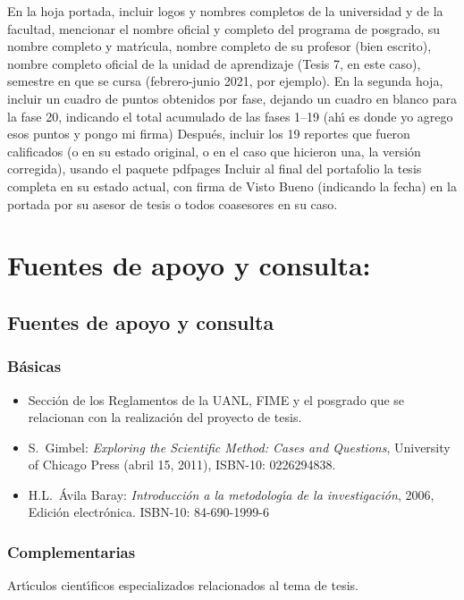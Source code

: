 \documentclass[10 pt]{article}
\begin{document}
En la hoja portada, incluir logos y nombres completos de la
universidad y de la facultad, mencionar el nombre oficial y completo
del programa de posgrado, su nombre completo y matr\'{\i}cula, nombre
completo de su profesor (bien escrito), nombre completo oficial de la
unidad de aprendizaje (Tesis 7, en este caso), semestre en que se
cursa (febrero-junio 2021, por ejemplo). En la segunda hoja, incluir
un cuadro de puntos obtenidos por fase, dejando un cuadro en blanco
para la fase 20, indicando el total acumulado de las fases 1--19 (ah\'{\i}
es donde yo agrego esos puntos y pongo mi firma) Despu\'{e}s, incluir los
19 reportes que fueron calificados (o en su estado original, o en el
caso que hicieron una, la versi\'{o}n corregida), usando el paquete
pdfpages Incluir al final del portafolio la tesis completa en su
estado actual, con firma de Visto Bueno (indicando la fecha) en la
portada por su asesor de tesis o todos coasesores en su caso.

\section{Fuentes de apoyo y consulta:}
\subsection{Fuentes de apoyo y consulta}
\subsubsection{B\'{a}sicas}

\begin{itemize}[itemsep=0em]
  
\item{Secci\'{o}n de los Reglamentos de la UANL, FIME y el posgrado
    que se relacionan con la realizaci\'{o}n del proyecto de tesis.}
  
\item{S.\ {\sc Gimbel}: {\em Exploring the Scientific Method: Cases
      and Questions}, University of Chicago Press (abril 15, 2011),
    ISBN-10: 0226294838.}
  
\item{ H.L.\ {\sc \'{A}vila Baray}: {\em Introducci\'{o}n a la
      metodolog\'{\i}a de la investigaci\'{o}n}, 2006, Edici\'{o}n
    electr\'{o}nica. ISBN-10: 84-690-1999-6}
  
\end{itemize}

\subsubsection{Complementarias}

Art\'{\i}culos cient\'{\i}ficos especializados relacionados al tema de tesis.
 
\label{final} %


\end{document}
